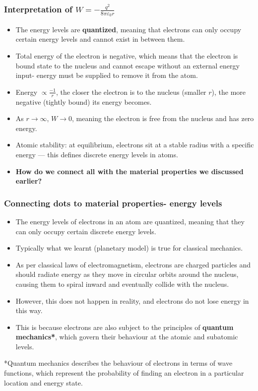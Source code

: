 \begin{frame}
	\frametitle{Interpretation of $W = -\frac{q^2}{8 \pi \varepsilon_0 r}$}
    \begin{itemize}
        \item The energy levels are \textbf{quantized}, meaning that electrons can only occupy certain energy levels and cannot exist in between them.
        \item Total energy of the electron is negative, which means that the electron is bound state to the nucleus and cannot escape without an external energy input- energy must be supplied to remove it from the atom.
        \item Energy $\propto \frac{-1}{r}$, the closer the electron is to the nucleus (smaller $r$), the more negative (tightly bound) its energy becomes.
        \item As $r \rightarrow \infty$, $W \rightarrow 0$, meaning the electron is free from the nucleus and has zero energy.
        \item Atomic stability: at equilibrium, electrons sit at a stable radius with a specific energy — this defines discrete energy levels in atoms.
        \item \textbf{How do we connect all with the material properties we discussed earlier?}
    \end{itemize}
\end{frame}

\begin{frame}
	\frametitle{Connecting dots to material properties- energy levels}
    \begin{itemize}
        \item The energy levels of electrons in an atom are quantized, meaning that they can only occupy certain discrete energy levels.
        \item Typically what we learnt (planetary model) is true for classical mechanics.
        \item As per classical laws of electromagnetism, electrons are charged particles and should radiate energy as they move in circular orbits around the nucleus, causing them to spiral inward and eventually collide with the nucleus.
        \item However, this does not happen in reality, and electrons do not lose energy in this way.
        \item This is because electrons are also subject to the principles of \textbf{quantum mechanics*}, which govern their behaviour at the atomic and subatomic levels.
    \end{itemize}
{\footnotesize{*Quantum mechanics describes the behaviour of electrons in terms of wave functions, which represent the probability of finding an electron in a particular location and energy state.}}
\end{frame}

